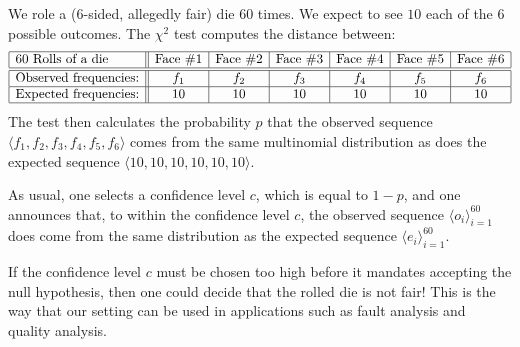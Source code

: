 \bigskip

We role a ($6$-sided, allegedly fair) die $60$ times.  We expect to see $10$ each of the $6$ possible outcomes.  The $\chi^2$ test computes the distance between:
\[ \begin{array}{|l||c|c|c|c|c|c|}
\hline
\mbox{60 Rolls of a die}  &
\mbox{Face } \#1 &
\mbox{Face } \#2 &
\mbox{Face } \#3 &
\mbox{Face } \#4 &
\mbox{Face } \#5 &
\mbox{Face } \#6 \\
\hline \hline 
\mbox{Observed frequencies:}
  & f_1 & f_2 & f_3 & f_4 & f_5 & f_6 \\
\hline
\mbox{Expected frequencies:}
  & 10 & 10 & 10 & 10 & 10 & 10 \\
\hline
\end{array}
\]
The test then calculates the probability $p$ that the observed sequence $\langle f_1, f_2, f_3, f_4, f_5, f_6 \rangle$ comes from the same multinomial distribution as does the expected sequence $\langle 10, 10, 10, 10, 10, 10 \rangle$. 

As usual, one selects a confidence level $c$, which is equal to $1-p$, and one announces that, to within the confidence level $c$, the observed sequence $\langle o_i \rangle_{i=1}^{60}$ does come from the same distribution as the expected sequence $\langle e_i \rangle_{i=1}^{60}$.

If the confidence level $c$ must be chosen too high before it mandates accepting the null hypothesis, then one could decide that the rolled die is not fair!  This is the way that our setting can be used in applications such as fault analysis and quality analysis.


